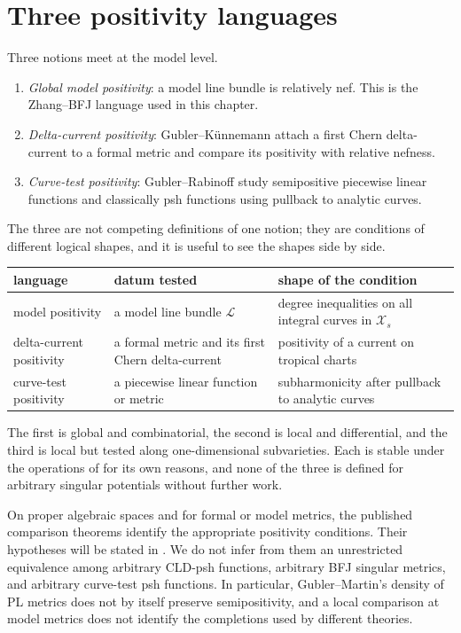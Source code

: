 \section{Three positivity languages}
\label{sec:metrics-positivity-interface}

Three notions meet at the model level.

\begin{enumerate}
\item \emph{Global model positivity}: a model line bundle is relatively nef.
This is the Zhang--BFJ language used in this chapter.
\item \emph{Delta-current positivity}: Gubler--Künnemann attach a first Chern
delta-current to a formal metric and compare its positivity with relative
nefness.
\item \emph{Curve-test positivity}: Gubler--Rabinoff study semipositive
piecewise linear functions and classically psh functions using pullback to
analytic curves.
\end{enumerate}

The three are not competing definitions of one notion; they are conditions
of different logical shapes, and it is useful to see the shapes side by
side.

\medskip
\noindent
\begin{tabular}{@{}p{}p{}p{}@{}}
\toprule
language & datum tested & shape of the condition\\
\midrule
model positivity
 & a model line bundle $\mathcal L$
 & degree inequalities on all integral curves in $\mathcal X_s$\\
delta-current positivity
 & a formal metric and its first Chern delta-current
 & positivity of a current on tropical charts\\
curve-test positivity
 & a piecewise linear function or metric
 & subharmonicity after pullback to analytic curves\\
\bottomrule
\end{tabular}
\medskip

\noindent The first is global and combinatorial, the second is local and
differential, and the third is local but tested along one-dimensional
subvarieties. Each is stable under the operations of
 for its own reasons, and none of the
three is defined for arbitrary singular potentials without further work.

On proper algebraic spaces and for formal or model metrics, the published
comparison theorems identify the appropriate positivity conditions. Their
hypotheses will be stated in
. We do not infer from them an
unrestricted equivalence among arbitrary CLD-psh functions, arbitrary
BFJ singular metrics, and arbitrary curve-test psh functions. In particular,
Gubler--Martin's density of PL metrics does not by itself preserve
semipositivity, and a local comparison at model metrics does not identify
the completions used by different theories.


